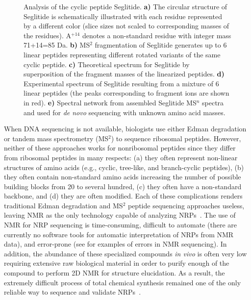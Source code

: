 \documentclass[8.5pt,twoside,twocolumn]{article}
\begin{document}
\begin{figure}[!htb]
\centering
{}
\caption{Analysis of the cyclic peptide Seglitide. \textbf{a)} The circular structure of Seglitide is schematically illustrated with each residue represented by a different color (slice sizes not scaled to corresponding masses of the residues). A$^{+14}$ denotes a non-standard residue with integer mass 71+14=85 Da. \textbf{b)} MS$^2$ fragmentation of Seglitide generates up to 6 linear peptides representing different rotated variants of the same cyclic peptide. \textbf{c)} Theoretical spectrum for Seglitide by superposition of the fragment masses of the linearized peptides. \textbf{d)} Experimental spectrum of Seglitide resulting from a mixture of 6 linear peptides (the peaks corresponding to fragment ions
are shown in red). \textbf{e)} Spectral network from assembled Seglitide MS$^n$ spectra and used for {\em de novo} sequencing with unknown amino acid masses.}
\label{figNRPs}
\end{figure}

When DNA sequencing is not available, biologists use either Edman degradation or tandem mass spectrometry (MS$^2$) to sequence ribosomal peptides. However, neither of these approaches works for nonribosomal peptides since they differ from ribosomal peptides in many respects: (a) they often represent non-linear structures of amino acids (e.g., cyclic,  tree-like, and branch-cyclic peptides), (b) they often contain non-standard amino acids increasing the number of possible building blocks from 20 to several hundred, (c) they often have a non-standard backbone, and (d) they are often modified. Each of these complications renders traditional Edman degradation and MS$^2$ peptide sequencing approaches useless, leaving NMR as the only technology capable of analyzing NRPs~\cite{butcher06,williams05,luesch02,hamada05}. The use of NMR for NRP sequencing is time-consuming,
difficult to automate (there are currently no software tools for automatic interpretation of NRPs from NMR data), and  error-prone (see \cite{hamada05,ireland82} for examples of errors in NMR sequencing). In addition, the abundance of these specialized compounds {\em in vivo} is often very low requiring extensive raw biological material in order to purify enough of the compound to perform 2D NMR for structure elucidation. As a result, the extremely difficult process of total chemical synthesis remained one of the only reliable way to sequence and validate NRPs~\cite{Kurosawa05}.
\end{document}
